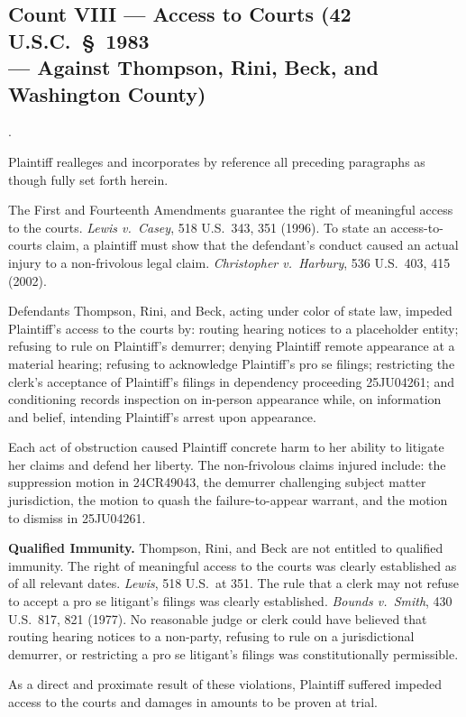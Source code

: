 \documentclass[12pt,letterpaper]{article}
\newcounter{complaintpara}
\newenvironment{paras}{%
	\begin{list}{\arabic{complaintpara}.}{%
			\setlength{\leftmargin}{0.5in}%
			\setlength{\labelwidth}{0.4in}%
			\setlength{\labelsep}{0.1in}%
			\setlength{\itemsep}{0pt}%
			\setlength{\parsep}{0pt}%
			\setlength{\topsep}{6pt}%
		}%
	}{%
	\end{list}%
}
\begin{document}
	\subsection*{Count VIII --- Access to Courts (42 U.S.C.\ \S\ 1983\\
		--- Against Thompson, Rini, Beck, and Washington County)}
	\begin{paras}
		
		\item Plaintiff realleges and incorporates by reference all
		preceding paragraphs as though fully set forth herein.
		
		\item The First and Fourteenth Amendments guarantee the right
		of meaningful access to the courts. \textit{Lewis v.\ Casey},
		518 U.S.\ 343, 351 (1996). To state an access-to-courts
		claim, a plaintiff must show that the defendant's conduct
		caused an actual injury to a non-frivolous legal claim.
		\textit{Christopher v.\ Harbury}, 536 U.S.\ 403, 415 (2002).
		
		\item Defendants Thompson, Rini, and Beck, acting under color
		of state law, impeded Plaintiff's access to the courts by:
		routing hearing notices to a placeholder entity; refusing to
		rule on Plaintiff's demurrer; denying Plaintiff remote
		appearance at a material hearing; refusing to acknowledge
		Plaintiff's pro se filings; restricting the clerk's
		acceptance of Plaintiff's filings in dependency proceeding
		25JU04261; and conditioning records inspection on in-person
		appearance while, on information and belief, intending
		Plaintiff's arrest upon appearance.
		
		\item Each act of obstruction caused Plaintiff concrete harm
		to her ability to litigate her claims and defend her liberty.
		The non-frivolous claims injured include: the suppression
		motion in 24CR49043, the demurrer challenging subject matter
		jurisdiction, the motion to quash the failure-to-appear
		warrant, and the motion to dismiss in 25JU04261.
		
		\item \textbf{Qualified Immunity.} Thompson, Rini, and Beck are
		not entitled to qualified immunity. The right of meaningful
		access to the courts was clearly established as of all
		relevant dates. \textit{Lewis}, 518 U.S.\ at 351. The rule
		that a clerk may not refuse to accept a pro se litigant's
		filings was clearly established.
		\textit{Bounds v.\ Smith}, 430 U.S.\ 817, 821 (1977).
		No reasonable judge or clerk could have believed that
		routing hearing notices to a non-party, refusing to rule on
		a jurisdictional demurrer, or restricting a pro se litigant's
		filings was constitutionally permissible.
		
		\item As a direct and proximate result of these violations,
		Plaintiff suffered impeded access to the courts and damages
		in amounts to be proven at trial.
		
	\end{paras}
\end{document}
